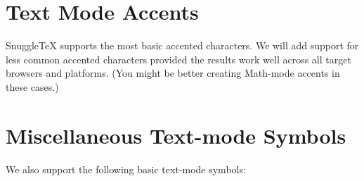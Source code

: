 \begin{demotable}
\styledemo{\tiny}
\styledemo{\scriptsize}
\styledemo{\footnotesize}
\styledemo{\small}
\styledemo{\normalsize}
\styledemo{\large}
\styledemo{\Large}
\styledemo{\LARGE}
\styledemo{\huge}
\styledemo{\Huge}
\end{demotable}

\section*{Text Mode Accents}

SnuggleTeX supports the most basic accented characters. We will add support for
less common accented characters provided the results work well across all
target browsers and platforms. (You might be better creating Math-mode accents
in these cases.)

\newcommand{\ademo}[1]{\demo{#1{a}}}

\begin{demotable}
\ademo{\'}
\ademo{\`}
\ademo{\^}
\ademo{\~}
\ademo{\"}
\ademo{\underline}
\end{demotable}

\section{Miscellaneous Text-mode Symbols}

We also support the following basic text-mode symbols:

\begin{demotable}
\demo{\ae}
\demo{\oe}
\demo{\dag}
\demo{\ldots}
\demo{\pounds}
\end{demotable}


